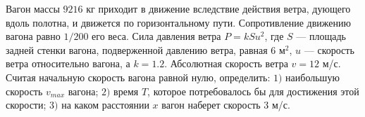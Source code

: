 Вагон массы $9216$ кг приходит в движение вследствие действия ветра,
дующего вдоль полотна, и движется по горизонтальному пути. Сопротивление
движению вагона равно $1/200$ его веса. Сила давления ветра
$P=kSu^2$, где $S$ --- площадь задней стенки вагона, подверженной
давлению ветра, равная $6$ м$^2$, $u$ --- скорость ветра относительно
вагона, а $k=1.2$. Абсолютная скорость ветра $v=12$ м/с. Считая
начальную скорость вагона равной нулю, определить:
$1)$ наибольшую скорость $v_{max}$ вагона;
$2)$ время $T$, которое потребовалось бы для достижения этой скорости;
$3)$ на каком расстоянии $x$ вагон наберет скорость $3$ м/с.
